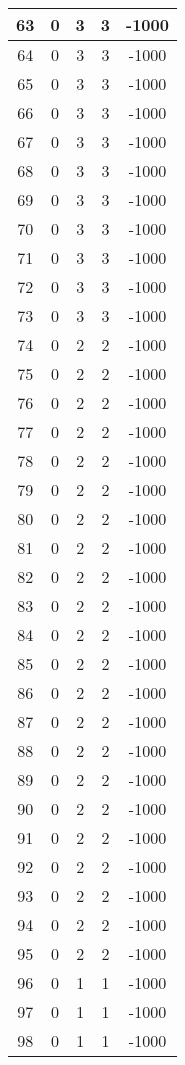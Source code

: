 \documentclass[letterpaper, 12pt]{article}
\begin{document}
\begin{longtable}{|c|c|c|c|c|}
\hline
63 & 0 & 3 & 3 & -1000 \\
\hline
64 & 0 & 3 & 3 & -1000 \\
\hline
65 & 0 & 3 & 3 & -1000 \\
\hline
66 & 0 & 3 & 3 & -1000 \\
\hline
67 & 0 & 3 & 3 & -1000 \\
\hline
68 & 0 & 3 & 3 & -1000 \\
\hline
69 & 0 & 3 & 3 & -1000 \\
\hline
70 & 0 & 3 & 3 & -1000 \\
\hline
71 & 0 & 3 & 3 & -1000 \\
\hline
72 & 0 & 3 & 3 & -1000 \\
\hline
73 & 0 & 3 & 3 & -1000 \\
\hline
74 & 0 & 2 & 2 & -1000 \\
\hline
75 & 0 & 2 & 2 & -1000 \\
\hline
76 & 0 & 2 & 2 & -1000 \\
\hline
77 & 0 & 2 & 2 & -1000 \\
\hline
78 & 0 & 2 & 2 & -1000 \\
\hline
79 & 0 & 2 & 2 & -1000 \\
\hline
80 & 0 & 2 & 2 & -1000 \\
\hline
81 & 0 & 2 & 2 & -1000 \\
\hline
82 & 0 & 2 & 2 & -1000 \\
\hline
83 & 0 & 2 & 2 & -1000 \\
\hline
84 & 0 & 2 & 2 & -1000 \\
\hline
85 & 0 & 2 & 2 & -1000 \\
\hline
86 & 0 & 2 & 2 & -1000 \\
\hline
87 & 0 & 2 & 2 & -1000 \\
\hline
88 & 0 & 2 & 2 & -1000 \\
\hline
89 & 0 & 2 & 2 & -1000 \\
\hline
90 & 0 & 2 & 2 & -1000 \\
\hline
91 & 0 & 2 & 2 & -1000 \\
\hline
92 & 0 & 2 & 2 & -1000 \\
\hline
93 & 0 & 2 & 2 & -1000 \\
\hline
94 & 0 & 2 & 2 & -1000 \\
\hline
95 & 0 & 2 & 2 & -1000 \\
\hline
96 & 0 & 1 & 1 & -1000 \\
\hline
97 & 0 & 1 & 1 & -1000 \\
\hline
98 & 0 & 1 & 1 & -1000 \\

\end{longtable}
\end{document}
